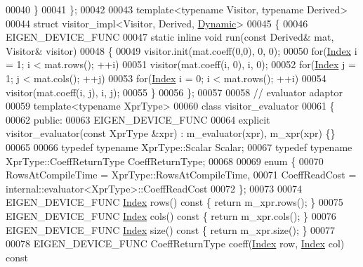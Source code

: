 \begin{DoxyCode}
00040   \}
00041 \};
00042 
00043 \textcolor{keyword}{template}<\textcolor{keyword}{typename} Visitor, \textcolor{keyword}{typename} Derived>
00044 \textcolor{keyword}{struct }visitor\_impl<Visitor, Derived, \hyperlink{namespace_eigen_ad81fa7195215a0ce30017dfac309f0b2}{Dynamic}>
00045 \{
00046   EIGEN\_DEVICE\_FUNC
00047   \textcolor{keyword}{static} \textcolor{keyword}{inline} \textcolor{keywordtype}{void} run(\textcolor{keyword}{const} Derived& mat, Visitor& visitor)
00048   \{
00049     visitor.init(mat.coeff(0,0), 0, 0);
00050     \textcolor{keywordflow}{for}(\hyperlink{namespace_eigen_a62e77e0933482dafde8fe197d9a2cfde}{Index} i = 1; i < mat.rows(); ++i)
00051       visitor(mat.coeff(i, 0), i, 0);
00052     \textcolor{keywordflow}{for}(\hyperlink{namespace_eigen_a62e77e0933482dafde8fe197d9a2cfde}{Index} j = 1; j < mat.cols(); ++j)
00053       \textcolor{keywordflow}{for}(\hyperlink{namespace_eigen_a62e77e0933482dafde8fe197d9a2cfde}{Index} i = 0; i < mat.rows(); ++i)
00054         visitor(mat.coeff(i, j), i, j);
00055   \}
00056 \};
00057 
00058 \textcolor{comment}{// evaluator adaptor}
00059 \textcolor{keyword}{template}<\textcolor{keyword}{typename} XprType>
00060 \textcolor{keyword}{class }visitor\_evaluator
00061 \{
00062 \textcolor{keyword}{public}:
00063   EIGEN\_DEVICE\_FUNC
00064   \textcolor{keyword}{explicit} visitor\_evaluator(\textcolor{keyword}{const} XprType &xpr) : m\_evaluator(xpr), m\_xpr(xpr) \{\}
00065   
00066   \textcolor{keyword}{typedef} \textcolor{keyword}{typename} XprType::Scalar Scalar;
00067   \textcolor{keyword}{typedef} \textcolor{keyword}{typename} XprType::CoeffReturnType CoeffReturnType;
00068   
00069   \textcolor{keyword}{enum} \{
00070     RowsAtCompileTime = XprType::RowsAtCompileTime,
00071     CoeffReadCost = internal::evaluator<XprType>::CoeffReadCost
00072   \};
00073   
00074   EIGEN\_DEVICE\_FUNC \hyperlink{namespace_eigen_a62e77e0933482dafde8fe197d9a2cfde}{Index} rows()\textcolor{keyword}{ const }\{ \textcolor{keywordflow}{return} m\_xpr.rows(); \}
00075   EIGEN\_DEVICE\_FUNC \hyperlink{namespace_eigen_a62e77e0933482dafde8fe197d9a2cfde}{Index} cols()\textcolor{keyword}{ const }\{ \textcolor{keywordflow}{return} m\_xpr.cols(); \}
00076   EIGEN\_DEVICE\_FUNC \hyperlink{namespace_eigen_a62e77e0933482dafde8fe197d9a2cfde}{Index} size()\textcolor{keyword}{ const }\{ \textcolor{keywordflow}{return} m\_xpr.size(); \}
00077 
00078   EIGEN\_DEVICE\_FUNC CoeffReturnType coeff(\hyperlink{namespace_eigen_a62e77e0933482dafde8fe197d9a2cfde}{Index} row, \hyperlink{namespace_eigen_a62e77e0933482dafde8fe197d9a2cfde}{Index} col)\textcolor{keyword}{ const}

\end{DoxyCode}

